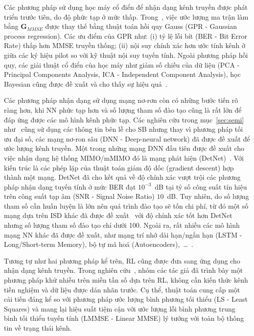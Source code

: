 Các phương pháp sử dụng học máy cổ điển để nhận dạng kênh truyền được phát triển trước tiên, do độ phức tạp ở mức thấp. Trong~\cite{Simeon2022}, việc ước lượng ma trận làm bằng $\mathbf{G}_{MMSE}$ được thay thế bằng thuật toán hồi quy Gauss (GPR - Gaussian process regression). Các ưu điểm của GPR như: (i) tỷ lệ lỗi bít (BER - Bit Error Rate) thấp hơn MMSE truyền thống; (ii) nội suy chính xác hơn ước tính kênh ở giữa các ký hiệu pilot so với kỹ thuật nội suy tuyến tính. Ngoài phương pháp hồi quy, các giải thuật cổ điển của học máy như giảm số chiều của dữ liệu (PCA - Principal Components Analysis, ICA - Independent Component Analysis), học Bayesian cũng được đề xuất và cho thấy sự hiệu quả~\cite{vilas2022}.

Các phương pháp nhận dạng sử dụng mạng nơ-rơn còn có những bước tiến rõ ràng hơn, khi NN phức tạp hơn và số lượng tham số đào tạo cũng là rất lớn để đáp ứng được các mô hình kênh phức tạp. Các nghiên cứu trong mục~\ref{sec:semi} như~\cite{Lin2020, Wan2008} cũng sử dụng các thông tin bên lề cho SB nhưng thay vì phương pháp tối ưu đại số, các mạng nơ-ron sâu (DNN - Deep-neural network) đã được đề xuất để ước lượng kênh truyền. Một trong những mạng DNN đầu tiên được đề xuất cho việc nhận dạng hệ thống MIMO/mMIMO đó là mạng phát hiện (DetNet)~\cite{Samuel2019}. Với kiến trúc là các phép lặp của thuật toán giảm độ dốc (gradient descent) hợp thành một mạng. DetNet đã cho kết quả về độ chính xác vượt trội các phương pháp nhận dạng tuyến tính ở mức BER đạt $10^{-3}$~dB tại tỷ số công suất tín hiệu trên công suất tạp âm (SNR - Signal Noise Ratio) $10$~dB. Tuy nhiên, do số lượng tham số cần huấn luyện là lớn nên quá trình đào tạo sẽ tốn chi phí, từ đó một số mạng dựa trên ISD khác đã được đề xuất~\cite{Mandloi2017, Liao2020} với độ chính xác tốt hơn DetNet nhưng số lượng tham số đào tạo chỉ dưới 100. Ngoài ra, rất nhiều các mô hình mạng NN khác đã được đề xuất, như mạng trí nhớ dài hạn/ngắn hạn (LSTM - Long/Short-term Memory), bộ tự mã hoá (Autoencoders),~\ldots~\cite{vilas2022}.

Tương tự như hai phương pháp kể trên, RL cũng được đưa sang ứng dụng cho nhận dạng kênh truyền. Trong nghiên cứu~\cite{Oh2021}, nhóm các tác giả đã trình bày một phương pháp khử nhiễu trên miền tần số dựa trên RL, không cần kiến thức kênh tiền nghiệm và dữ liệu được dán nhãn trước. Cụ thể, thuật toán cung cấp một cải tiến đáng kể so với phương pháp ước lượng bình phương tối thiểu (LS - Least Squares) và mang lại hiệu suất tiệm cận với ước lượng lỗi bình phương trung bình tối thiểu tuyến tính (LMMSE - Linear MMSE) lý tưởng với toàn bộ thông tin về trạng thái kênh.

